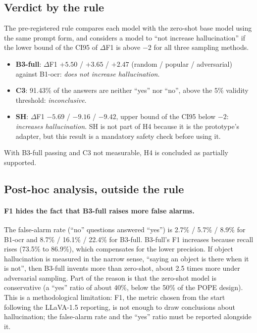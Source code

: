 \subsection{Verdict by the rule}

The pre-registered rule compares each model with the zero-shot base model using the same
prompt form, and considers a model to ``not increase hallucination'' if the lower bound of
the CI95 of $\Delta$F1 is above $-2$ for all three sampling methods.

\begin{itemize}
  \item \textbf{B3-full}: $\Delta$F1 $+5.50$ / $+3.65$ / $+2.47$ (random / popular /
  adversarial) against B1-ocr: \emph{does not increase hallucination}.
  \item \textbf{C3}: 91.43\% of the answers are neither ``yes'' nor ``no'', above the 5\%
  validity threshold: \emph{inconclusive}.
  \item \textbf{SH}: $\Delta$F1 $-5.69$ / $-9.16$ / $-9.42$, upper bound of the CI95 below
  $-2$: \emph{increases hallucination}. SH is not part of H4 because it is the prototype's
  adapter, but this result is a mandatory safety check before using it.
\end{itemize}

With B3-full passing and C3 not measurable, H4 is concluded as partially supported.

\subsection{Post-hoc analysis, outside the rule}

\paragraph{F1 hides the fact that B3-full raises more false alarms.} The false-alarm rate
(``no'' questions answered ``yes'') is 2.7\% / 5.7\% / 8.9\% for B1-ocr and 8.7\% / 16.1\% /
22.4\% for B3-full. B3-full's F1 increases because recall rises (73.5\% to 86.9\%), which
compensates for the lower precision. If object hallucination is measured in the narrow sense,
``saying an object is there when it is not'', then B3-full invents more than zero-shot,
about 2.5 times more under adversarial sampling. Part of the reason is that the zero-shot
model is conservative (a ``yes'' ratio of about 40\%, below the 50\% of the POPE design).
This is a methodological limitation: F1, the metric chosen from the start following the
LLaVA-1.5 reporting, is not enough to draw conclusions about hallucination; the false-alarm
rate and the ``yes'' ratio must be reported alongside it.

